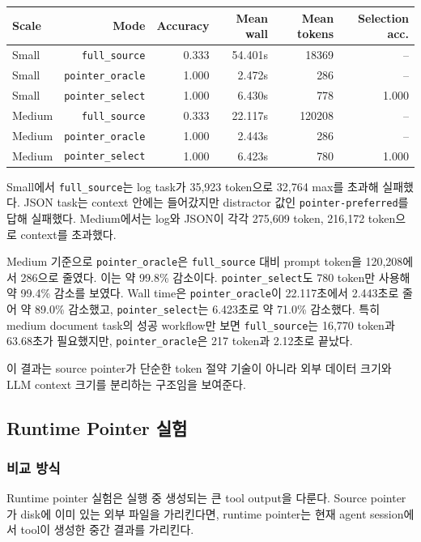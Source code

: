\documentclass[11pt,a4paper]{article}
\begin{document}
\begin{table}[htbp]
\centering
\small
\setlength{\tabcolsep}{4pt}
\begin{tabular}{lrrrrr}
\toprule
Scale & Mode & Accuracy & Mean wall & Mean tokens & Selection acc. \\
\midrule
Small & \texttt{full\_source} & 0.333 & 54.401s & 18369 & -- \\
Small & \texttt{pointer\_oracle} & 1.000 & 2.472s & 286 & -- \\
Small & \texttt{pointer\_select} & 1.000 & 6.430s & 778 & 1.000 \\
Medium & \texttt{full\_source} & 0.333 & 22.117s & 120208 & -- \\
Medium & \texttt{pointer\_oracle} & 1.000 & 2.443s & 286 & -- \\
Medium & \texttt{pointer\_select} & 1.000 & 6.423s & 780 & 1.000 \\
\bottomrule
\end{tabular}
\end{table}

Small에서 \texttt{full\_source}는 log task가 35,923 token으로 32,764 max를 초과해 실패했다. JSON task는 context 안에는 들어갔지만 distractor 값인 \texttt{pointer-preferred}를 답해 실패했다. Medium에서는 log와 JSON이 각각 275,609 token, 216,172 token으로 context를 초과했다.

Medium 기준으로 \texttt{pointer\_oracle}은 \texttt{full\_source} 대비 prompt token을 120,208에서 286으로 줄였다. 이는 약 99.8\% 감소이다. \texttt{pointer\_select}도 780 token만 사용해 약 99.4\% 감소를 보였다. Wall time은 \texttt{pointer\_oracle}이 22.117초에서 2.443초로 줄어 약 89.0\% 감소했고, \texttt{pointer\_select}는 6.423초로 약 71.0\% 감소했다. 특히 medium document task의 성공 workflow만 보면 \texttt{full\_source}는 16,770 token과 63.68초가 필요했지만, \texttt{pointer\_oracle}은 217 token과 2.12초로 끝났다.

이 결과는 source pointer가 단순한 token 절약 기술이 아니라 외부 데이터 크기와 LLM context 크기를 분리하는 구조임을 보여준다.

\subsection{Runtime Pointer 실험}

\subsubsection{비교 방식}

Runtime pointer 실험은 실행 중 생성되는 큰 tool output을 다룬다. Source pointer가 disk에 이미 있는 외부 파일을 가리킨다면, runtime pointer는 현재 agent session에서 tool이 생성한 중간 결과를 가리킨다.
\end{document}
